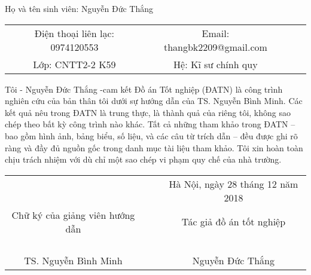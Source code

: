\cleardoublepage

\begin{dedication}
	
	
	
  Họ và tên sinh viên: Nguyễn Đức Thắng 
   
   	\begin{tabu}{ *2 {  c  c }}
 
   		 Điện thoại liên lạc: 0974120553 &  Email: thangbk2209@gmail.com \\

   		 Lớp: CNTT2-2 K59 & Hệ: Kĩ sư chính quy\\

  
   	\end{tabu}

  Tôi - Nguyễn Đức Thắng -cam kết Đồ án Tốt nghiệp (ĐATN) là công trình nghiên cứu của bản thân tôi dưới sự hướng dẫn của TS. Nguyễn Bình Minh. Các kết quả nêu trong ĐATN là trung thực, là thành quả của riêng tôi, không sao chép theo bất kỳ công trình nào khác. Tất cả những tham khảo trong ĐATN – bao gồm hình ảnh, bảng biểu, số liệu, và các câu từ trích dẫn – đều được ghi rõ ràng và đầy đủ nguồn gốc trong danh mục tài liệu tham khảo. Tôi xin hoàn toàn chịu trách nhiệm với dù chỉ một sao chép vi phạm quy chế của nhà trường.
  
  \begin{tabu} {  c c c c }
  	
  	 & & & Hà Nội, ngày 28 tháng 12 năm 2018\\
  	Chữ ký của giảng viên hướng dẫn & & & Tác giả đồ án tốt nghiệp\\
  	\\
  	\\
  	\\
  	\\
  	TS. Nguyễn Bình Minh & & & Nguyễn Đức Thắng\\
  	
  	
  \end{tabu}
\end{dedication}